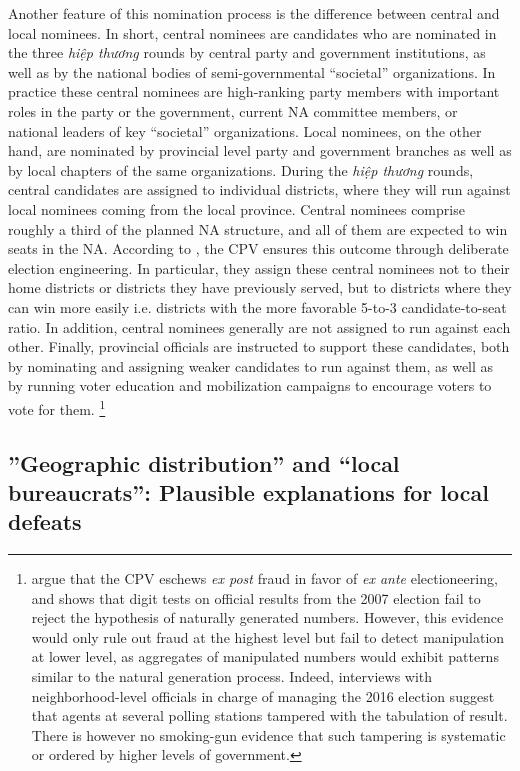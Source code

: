 \documentclass[12pt]{article}\usepackage[]{graphicx}\usepackage[]{color}
\newcommand{\1}{\mathbbm{1}}
\begin{document}
Another feature of this nomination process is the difference between central and local nominees. In short, central nominees are candidates who are nominated in the three \textit{hiệp thương} rounds by central party and government institutions, as well as by the national bodies of semi-governmental ``societal'' organizations. In practice these central nominees are high-ranking party members with important roles in the party or the government, current NA committee members, or national leaders of key ``societal'' organizations. Local nominees, on the other hand, are nominated by provincial level party and government branches as well as by local chapters of the same organizations. During the \textit{hiệp thương} rounds, central candidates are assigned to individual districts, where they will run against local nominees coming from the local province. Central nominees comprise roughly a third of the planned NA structure, and all of them are expected to win seats in the NA. According to \cite{MaleskySchuler2011}, the CPV ensures this outcome  through deliberate election engineering. In particular, they assign these central nominees not to their home districts or districts they have previously served, but to districts where they can win more easily i.e. districts with the more favorable 5-to-3 candidate-to-seat ratio. In addition,  central nominees generally are not assigned to run against each other. Finally, provincial officials are instructed to support these candidates, both by nominating and assigning  weaker candidates to run against them, as well as by running voter education and mobilization campaigns to encourage voters to vote for them. \footnote{\cite{MaleskySchuler2011} argue that the CPV eschews \textit{ex post} fraud in favor of \textit{ex ante} electioneering, and shows that digit tests on official results from the 2007 election fail to reject the hypothesis of naturally generated numbers. However, this evidence would only rule out fraud at the highest level but fail to detect manipulation at lower level, as aggregates of manipulated numbers would exhibit patterns similar to the natural generation process. Indeed, interviews with neighborhood-level officials in charge of managing the 2016 election suggest that agents at several polling stations tampered with the tabulation of result. There is however no smoking-gun evidence that such tampering is systematic or ordered by higher levels of government.}

\subsection{''Geographic distribution'' and ``local bureaucrats'': Plausible explanations for local defeats}
\end{document}
